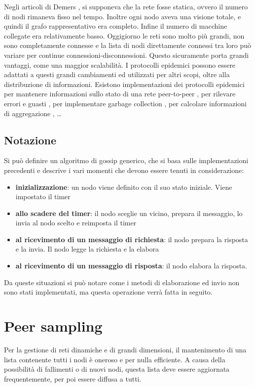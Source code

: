 Negli articoli di Demers \cite{demers}, si supponeva che la rete fosse statica, ovvero il numero di nodi rimaneva fisso nel tempo. Inoltre ogni nodo aveva una visione totale, e quindi il grafo rappresentativo era completo. Infine il numero di macchine collegate era relativamente basso.
Oggigiorno le reti sono molto più grandi, non sono completamente connesse e la lista di nodi direttamente connessi tra loro può variare per continue connessioni-disconnessioni. Questo sicuramente porta grandi vantaggi, come una maggior scalabilità. I protocolli epidemici possono essere adattati a questi grandi cambiamenti ed utilizzati per altri scopi, oltre alla distribuzione di informazioni. Esistono implementazioni dei protocolli epidemici per mantenere informazioni sullo stato di una rete peer-to-peer \cite{newscast}, per rilevare errori e guasti \cite{swim}, per implementare garbage collection \cite{garbage_collection}, per calcolare informazioni di aggregazione \cite{aggregation}, …
\subsection{Notazione}

Si può definire un algoritmo di gossip generico, che si basa sulle implementazioni precedenti e descrive i vari momenti che devono essere tenuti in considerazione:
\begin{itemize}
    \item \textbf{inizializzazione}: un nodo viene definito con il suo stato iniziale. Viene impostato il timer
    \item \textbf{allo scadere del timer}: il nodo sceglie un vicino, prepara il messaggio, lo invia al nodo scelto e reimposta il timer
    \item \textbf{al ricevimento di un messaggio di richiesta}: il nodo prepara la risposta e la invia. Il nodo legge la richiesta e la elabora
    \item \textbf{al ricevimento di un messaggio di risposta}: il nodo elabora la risposta.
\end{itemize}

Da queste situazioni si può notare come i metodi di elaborazione ed invio non sono stati implementati, ma questa operazione verrà fatta in seguito. 

\section{Peer sampling}

Per la gestione di reti dinamiche e di grandi dimensioni, il mantenimento di una lista contenente tutti i nodi è oneroso e per nulla efficiente. A causa della possibilità di fallimenti o di nuovi nodi, questa lista deve essere aggiornata frequentemente, per poi essere diffusa a tutti. 

